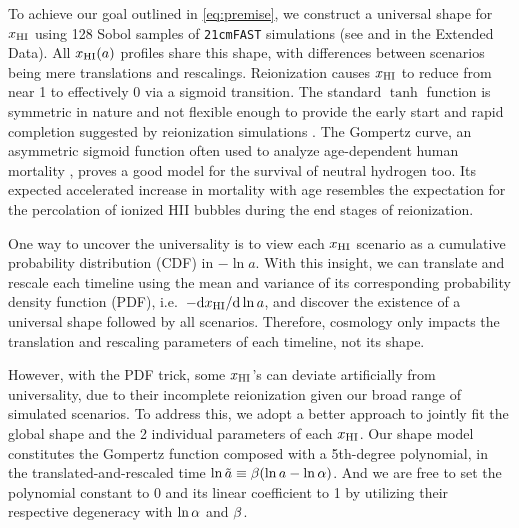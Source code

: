 To achieve our goal outlined in \cref{eq:premise}, we construct a
universal shape for $x_{\mathrm{HI}}$ using 128 Sobol samples of \texttt{21cmFAST} simulations
(see  and  in the Extended Data).
All $x_{\mathrm{HI}}(a)$ profiles share this shape, with differences between
scenarios being mere translations and rescalings.
Reionization causes $x_{\mathrm{HI}}$ to reduce from near 1 to effectively 0 via a
sigmoid transition.
The standard $\tanh$ function is symmetric in nature and not flexible
enough to provide the early start and rapid completion suggested by
reionization simulations \cite{Trac2018, Doussot2019}.
The Gompertz curve, an asymmetric sigmoid function often used to analyze
age-dependent human mortality \cite{Gompertz1825}, proves a good model
for the survival of neutral hydrogen too.
Its expected accelerated increase in mortality with age resembles the
expectation for the percolation of ionized HII bubbles during the end
stages of reionization.

One way to uncover the universality is to view each $x_{\mathrm{HI}}$ scenario as
a cumulative probability distribution (CDF) in $- \ln a$.
With this insight, we can translate and rescale each timeline using the
mean and variance of its corresponding probability density function
(PDF), i.e.\ $- \mathrm{d}x_{\mathrm{HI}} / \mathrm{d}\ln a$, and discover the
existence of a universal shape followed by all scenarios.
Therefore, cosmology only impacts the translation and rescaling
parameters of each timeline, not its shape.

However, with the PDF trick, some $x_{\mathrm{HI}}$'s can deviate artificially
from universality, due to their incomplete reionization given our broad
range of simulated scenarios.
To address this, we adopt a better approach to jointly fit the global
shape and the 2 individual parameters of each $x_{\mathrm{HI}}$.
Our shape model constitutes the Gompertz function composed with a
5th-degree polynomial, in the translated-and-rescaled time $\ln\tilde{a}
\equiv \beta (\ln a - \ln\alpha)$.
And we are free to set the polynomial constant to 0 and its linear
coefficient to 1 by utilizing their respective degeneracy with $\ln\alpha$
and $\beta$.

